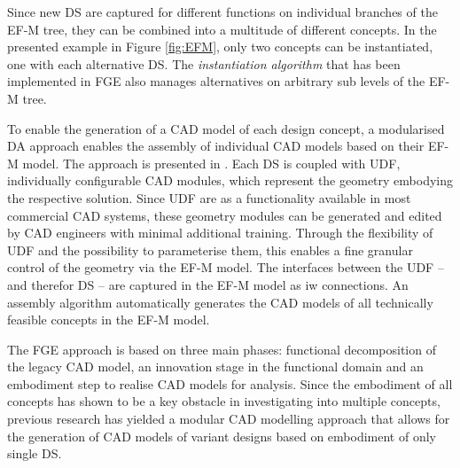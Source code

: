 \documentclass[preprints,article,accept,moreauthors,pdftex]{Definitions/mdpi}
\newcommand{\Jakob}[1]{{{\color{orange}{\itshape{#1}}\color{black}}
    }{\ignorespaces}}
\begin{document}
Since new \ac{DS} are captured for different functions on individual branches of the EF-M tree, they can be combined into a multitude of different concepts.
In the presented example in Figure \ref{fig:EFM}, only two concepts can be instantiated, one with each alternative \ac{DS}.
The \textit{instantiation algorithm} that has been implemented in \ac{FGE} also manages alternatives on arbitrary sub levels of the \ac{EF-M} tree.

To enable the generation of a CAD model of each design concept, a modularised \ac{DA} approach enables the assembly of individual CAD models based on their EF-M model.
The approach is presented in \cite{Muller2021FunctionVariants}.
Each \ac{DS} is coupled with \ac{UDF}, individually configurable CAD modules, which represent the geometry embodying the respective solution.
Since \ac{UDF} are as a functionality available in most commercial CAD systems, these geometry modules can be generated and edited by CAD engineers with minimal additional training.
Through the flexibility of \ac{UDF} and the possibility to parameterise them, this enables a fine granular control of the geometry via the \ac{EF-M} model.
The interfaces between the \ac{UDF} -- and therefor \ac{DS} -- are captured in the \ac{EF-M} model as \ac{iw} connections.
An assembly algorithm automatically generates the CAD models of all technically feasible concepts in the \ac{EF-M} model.



The \ac{FGE} approach is based on three main phases: functional decomposition of the legacy CAD model, an innovation stage in the functional domain and an embodiment step to realise CAD models for analysis.
Since the embodiment of all concepts has shown to be a key obstacle in investigating into multiple concepts, previous research \citep{Muller2020a} has yielded a modular CAD modelling approach that allows for the generation of CAD models of variant designs based on embodiment of only single \ac{DS}.


\end{document}
